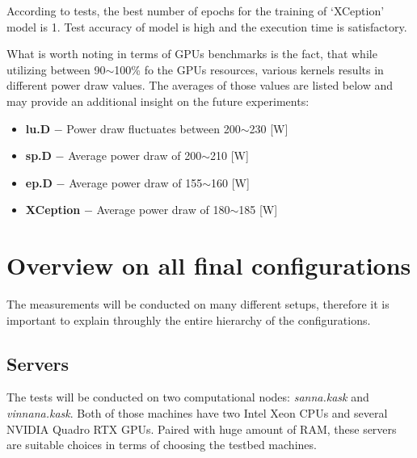 According to tests, the best number of epochs for the training of `XCeption'
model is 1. Test accuracy of model is high and the execution time is
satisfactory.

What is worth noting in terms of GPUs benchmarks is the fact, that while
utilizing between 90$\sim$100\% fo the GPUs resources, various kernels results in
different power draw values. The averages of those values are listed below and
may provide an additional insight on the future experiments:

\begin{itemize}
    \item \textbf{lu.D} $-$ Power draw fluctuates between 200$\sim$230 [W]
    \item \textbf{sp.D} $-$ Average power draw of 200$\sim$210 [W]
    \item \textbf{ep.D} $-$ Average power draw of 155$\sim$160 [W]
    \item \textbf{XCeption} $-$ Average power draw of 180$\sim$185 [W]
\end{itemize}
\newpage

\section{Overview on all final configurations}

The measurements will be conducted on many different setups, therefore it is
important to explain throughly the entire hierarchy of the configurations.

\subsection{Servers}
The tests will be conducted on two computational nodes: \emph{sanna.kask}
and \emph{vinnana.kask}\@. Both of those machines have two Intel Xeon CPUs and
several NVIDIA Quadro RTX GPUs. Paired with huge amount of RAM, these servers
are suitable choices in terms of choosing the testbed machines.

